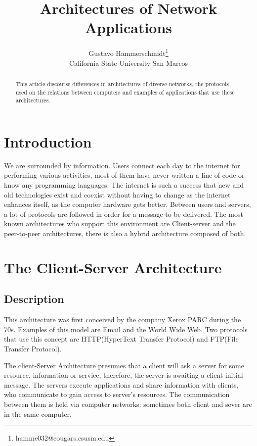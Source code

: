 \documentclass[12pt,a4paper]{article}
\title{Architectures of Network Applications}
\author{ Gustavo Hammerschmidt\thanks{hamme032@cougars.csusm.edu} \\ California State University San Marcos\\ }
\begin{document}
\maketitle

\begin{abstract}

 This article discourse differences in architectures of diverse networks, the protocols used on the relations between computers and examples of applications that use these architectures.
 
\end{abstract}

\section{Introduction\label{intro}}

We are surrounded by information. Users connect each day to the internet for performing various activities, most of them have never written a line of code or know any programming languages. The internet is such a success that new and old technologies exist and coexist without having to change as the internet enhances itself\cite{computerNetwork}, as the computer hardware gets better. Between users and servers, a lot of protocols are followed in order for a message to be delivered. The most known architectures who support this environment are Client-server and the peer-to-peer architectures, there is also a hybrid architecture composed of both.


\section{The Client-Server Architecture \label{Client-server Architecture}}

\subsection{Description}

This architecture was first conceived by the company Xerox PARC during the 70s. Examples of this model are Email and the World Wide Web. Two protocols that use this concept are HTTP(HyperText Transfer Protocol) and FTP(File Transfer Protocol).

The client-Server \cite{clientserver}\cite{csmodel} Architecture presumes that a client will ask a server for some resource, information or service, therefore, the server is awaiting a client initial message. The servers execute applications and share information with clients, who communicate to gain access to server's resources. The communication between them is held via computer networks; sometimes both client and sever are in the same computer.
\end{document}
